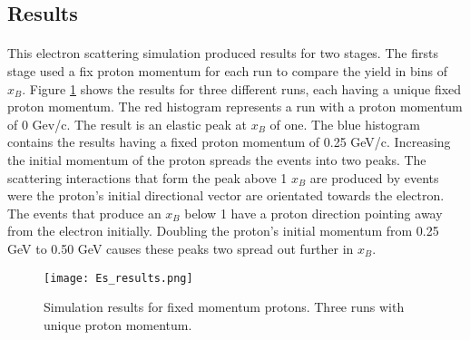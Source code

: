 \subsection{Results}
\paragraph{}This electron scattering simulation produced results for two stages. The firsts stage used a fix proton momentum for each run to compare the yield in bins of $x_B$. Figure \ref{ES_res} shows the results for three different runs, each having a unique fixed proton momentum. The red histogram represents a run with a proton momentum of 0 Gev/c. The result is an elastic peak at $x_B$ of one. The blue histogram contains the results having a fixed proton momentum of 0.25 GeV/c. Increasing the initial momentum of the proton spreads the events into two peaks. The scattering interactions that form the peak above 1 $x_B$ are produced by events were the proton's initial directional vector are orientated towards the electron. The events that produce an $x_B$ below 1 have a proton direction pointing away from the electron initially. Doubling the proton's initial momentum from 0.25 GeV to 0.50 GeV causes these peaks two spread out further in $x_B$.  


\begin{figure}[t]
\centering
\texttt{[image: Es\_results.png]}
\caption{Simulation results for fixed momentum protons. Three runs with unique proton momentum. }
\label{ES_res}
\end{figure}

